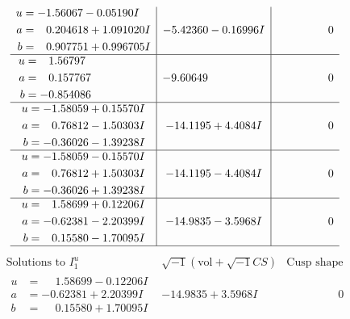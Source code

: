 \documentclass[1p]{elsarticle_modified}
\theoremstyle{definition}
\newcommand{\I}{\sqrt{-1}}
\begin{document}
$$\begin{array}{c|c|c}
\begin{aligned}
u &= -1.56067 - 0.05190 I \\
a &= \phantom{-}0.204618 + 1.091020 I \\
b &= \phantom{-}0.907751 + 0.996705 I\end{aligned}
 & -5.42360 - 0.16996 I & \phantom{-0.000000 } 0 \\ \hline\begin{aligned}
u &= \phantom{-}1.56797\phantom{ +0.000000I} \\
a &= \phantom{-}0.157767\phantom{ +0.000000I} \\
b &= -0.854086\phantom{ +0.000000I}\end{aligned}
 & -9.60649\phantom{ +0.000000I} & \phantom{-0.000000 } 0 \\ \hline\begin{aligned}
u &= -1.58059 + 0.15570 I \\
a &= \phantom{-}0.76812 - 1.50303 I \\
b &= -0.36026 - 1.39238 I\end{aligned}
 & -14.1195 + 4.4084 I & \phantom{-0.000000 } 0 \\ \hline\begin{aligned}
u &= -1.58059 - 0.15570 I \\
a &= \phantom{-}0.76812 + 1.50303 I \\
b &= -0.36026 + 1.39238 I\end{aligned}
 & -14.1195 - 4.4084 I & \phantom{-0.000000 } 0 \\ \hline\begin{aligned}
u &= \phantom{-}1.58699 + 0.12206 I \\
a &= -0.62381 - 2.20399 I \\
b &= \phantom{-}0.15580 - 1.70095 I\end{aligned}
 & -14.9835 - 3.5968 I & \phantom{-0.000000 } 0\\
 \hline 
 \end{array}$$\newpage$$\begin{array}{c|c|c}  
\text{Solutions to }I^u_{1}& \I (\text{vol} + \sqrt{-1}CS) & \text{Cusp shape}\\
 \hline 
\begin{aligned}
u &= \phantom{-}1.58699 - 0.12206 I \\
a &= -0.62381 + 2.20399 I \\
b &= \phantom{-}0.15580 + 1.70095 I\end{aligned}
 & -14.9835 + 3.5968 I & \phantom{-0.000000 } 0 \\ \hline\begin{aligned}

\end{aligned}
\end{array}$$
\end{document}
